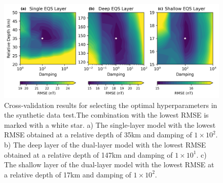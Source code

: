 \begin{figure}[tb!]
\centering
\includegraphics[width=1\linewidth]{paper/figures/cv_synthetic.png}
\caption{
    Cross-validation results for selecting the optimal hyperparameters in the synthetic data test.The combination with the lowest RMSE is marked with a white star. a) The single-layer model with the lowest RMSE obtained at a relative depth of 35km and damping of $1 \times 10^2$. b) The deep layer of the dual-layer model with the lowest RMSE obtained at a relative depth of 147km and damping of $1 \times 10^1$. c) The shallow layer of the dual-layer model with the lowest RMSE at a relative depth of 17km and damping of $1 \times 10^2$.
}
\label{fig:cv_synthetic}
\end{figure}

